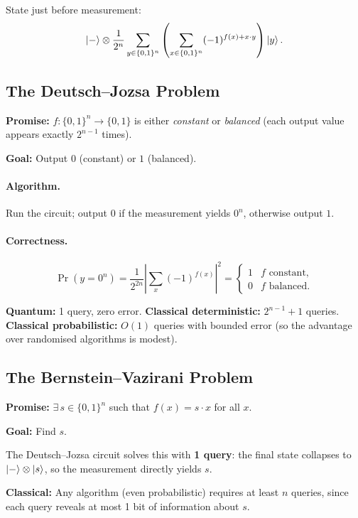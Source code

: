 \documentclass[11pt]{article}
\theoremstyle{definition}
\begin{document}
State just before measurement:
\[
    \ket{-}\otimes\frac{1}{2^n}\sum_{y\in\{0,1\}^n}\left(\sum_{x\in\{0,1\}^n}(-1)^{f(x)+x\cdot y}\right)\ket{y}.
\]

\subsection{The Deutsch--Jozsa Problem}

\textbf{Promise:} $f:\{0,1\}^n\to\{0,1\}$ is either \emph{constant} or \emph{balanced} (each output value appears exactly $2^{n-1}$ times).

\textbf{Goal:} Output $0$ (constant) or $1$ (balanced).

\paragraph{Algorithm.} Run the circuit; output $0$ if the measurement yields $0^n$, otherwise output $1$.

\paragraph{Correctness.}
\[
    \Pr(y=0^n) = \frac{1}{2^{2n}}\left|\sum_x (-1)^{f(x)}\right|^2
    = \begin{cases}1 & f\text{ constant},\\ 0 & f\text{ balanced}.\end{cases}
\]

\textbf{Quantum:} 1 query, zero error.  \textbf{Classical deterministic:} $2^{n-1}+1$ queries.  \textbf{Classical probabilistic:} $O(1)$ queries with bounded error (so the advantage over randomised algorithms is modest).

\subsection{The Bernstein--Vazirani Problem}

\textbf{Promise:} $\exists\,s\in\{0,1\}^n$ such that $f(x)=s\cdot x$ for all $x$.

\textbf{Goal:} Find $s$.

The Deutsch--Jozsa circuit solves this with \textbf{1 query}: the final state collapses to $\ket{-}\otimes\ket{s}$, so the measurement directly yields $s$.

\textbf{Classical:} Any algorithm (even probabilistic) requires at least $n$ queries, since each query reveals at most 1 bit of information about $s$.
\end{document}
